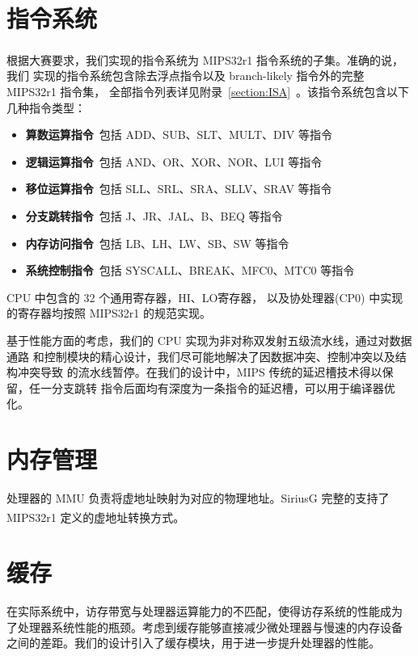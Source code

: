 \documentclass[blue,normal,cn,hide]{elegantbook}
\begin{document}
\section{指令系统}

根据大赛要求，我们实现的指令系统为 MIPS32r1 \textsuperscript{\cite{MIPS1A}\cite{MIPS2A} 
\cite{MIPS3}} 指令系统的子集。准确的说，我们
实现的指令系统包含除去浮点指令以及 branch-likely 指令外的完整 MIPS32r1 指令集，
全部指令列表详见附录~\ref{section:ISA}~。该指令系统包含以下几种指令类型：

\begin{itemize}
    \item \textbf{算数运算指令}\ 包括 ADD、SUB、SLT、MULT、DIV 等指令
    \item \textbf{逻辑运算指令}\ 包括 AND、OR、XOR、NOR、LUI 等指令
    \item \textbf{移位运算指令}\ 包括 SLL、SRL、SRA、SLLV、SRAV 等指令
    \item \textbf{分支跳转指令}\ 包括 J、JR、JAL、B、BEQ 等指令
    \item \textbf{内存访问指令}\ 包括 LB、LH、LW、SB、SW 等指令
    \item \textbf{系统控制指令}\ 包括 SYSCALL、BREAK、MFC0、MTC0 等指令
\end{itemize}

CPU 中包含的 32 个通用寄存器，HI、LO寄存器，
以及协处理器(CP0) 中实现的寄存器均按照 MIPS32r1 的规范实现。

基于性能方面的考虑，我们的 CPU 实现为非对称双发射五级流水线，通过对数据通路
和控制模块的精心设计，我们尽可能地解决了因数据冲突、控制冲突以及结构冲突导致
的流水线暂停。在我们的设计中，MIPS 传统的延迟槽技术得以保留，任一分支跳转
指令后面均有深度为一条指令的延迟槽，可以用于编译器优化。

\section{内存管理}

处理器的 MMU 负责将虚地址映射为对应的物理地址。SiriusG 完整的支持了
MIPS32r1 \textsuperscript{\cite{MIPS3}} 定义的虚地址转换方式。

\section{缓存}

在实际系统中，访存带宽与处理器运算能力的不匹配，使得访存系统的性能成为
了处理器系统性能的瓶颈。考虑到缓存能够直接减少微处理器与慢速的内存设备
之间的差距。我们的设计引入了缓存模块，用于进一步提升处理器的性能。
\end{document}
